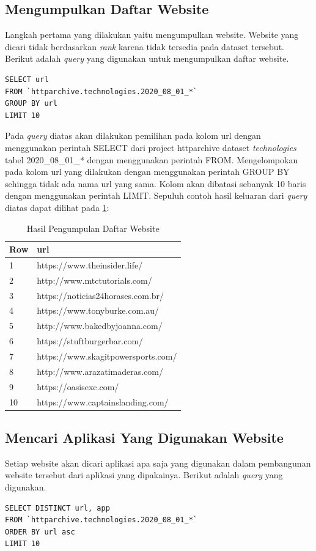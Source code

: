 \subsection{Mengumpulkan Daftar Website}
Langkah pertama yang dilakukan yaitu mengumpulkan website. Website yang dicari tidak berdasarkan \textit{rank} karena tidak tersedia pada dataset tersebut. Berikut adalah \textit{query} yang digunakan untuk mengumpulkan daftar website.
\begin{lstlisting}
SELECT url
FROM `httparchive.technologies.2020_08_01_*`
GROUP BY url
LIMIT 10
\end{lstlisting}

Pada \textit{query} diatas akan dilakukan pemilihan pada kolom url dengan menggunakan perintah SELECT dari project httparchive dataset \textit{technologies} tabel 2020\_08\_01\_* dengan menggunakan perintah FROM. Mengelompokan pada kolom url yang dilakukan dengan menggunakan perintah GROUP BY sehingga tidak ada nama url yang sama. Kolom akan dibatasi sebanyak 10 baris dengan menggunakan perintah LIMIT. Sepuluh contoh hasil keluaran dari \textit{query} diatas dapat dilihat pada \ref{table:contoh_langkah1}:

\begin{table}[H]
\centering
\begin{tabular}{|l|l|}
	\hline
	\textbf{Row} & \textbf{url}\\
	\hline
	1 & https://www.theinsider.life/\\
	\hline
	2 & http://www.mtctutorials.com/ \\
	\hline
	3 & https://noticias24horases.com.br/\\
	\hline
	4 & https://www.tonyburke.com.au/ \\
	\hline
	5 & http://www.bakedbyjoanna.com/\\
	\hline
	6 & https://stuftburgerbar.com/\\
	\hline
	7 & https://www.skagitpowersports.com/\\
	\hline
	8 & http://www.arazatimaderas.com/ \\
	\hline
	9 & https://oasisexc.com/\\
	\hline
	10 & https://www.captainslanding.com/\\
	\hline
\end{tabular}
\caption{Hasil Pengumpulan Daftar Website}
\label{table:contoh_langkah1}
\end{table}

\subsection{Mencari Aplikasi Yang Digunakan Website}
Setiap website akan dicari aplikasi apa saja yang digunakan dalam pembangunan website tersebut dari aplikasi yang dipakainya. Berikut adalah \textit{query} yang digunakan.
\begin{lstlisting}
SELECT DISTINCT url, app
FROM `httparchive.technologies.2020_08_01_*`
ORDER BY url asc
LIMIT 10
\end{lstlisting}

